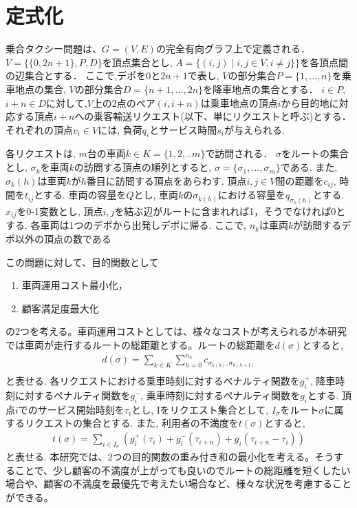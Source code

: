 \chapter{定式化}\label{formulation}
乗合タクシー問題は、$G = (V, E)$の完全有向グラフ上で定義される．$V =\{\{0,2n+1\},P,D\}$を頂点集合とし, $A = \{(i,j) \mid i,j\in V ,i \neq j\}\}$を各頂点間の辺集合とする．
ここで,デポを$0$と$2n+1$で表し, $V$の部分集合$P =\{1,...,n \}$を乗車地点の集合, $V$の部分集合$D =\{n+1,...,2n \}$を降車地点の集合とする．
$i \in P$, $i+n \in D$に対して,$V$上の2点のペア$(i,i+n)$は乗車地点の頂点$i$から目的地に対応する頂点$i+n$への乗客輸送リクエスト(以下、単にリクエストと呼ぶ)とする．
それぞれの頂点$v_i \in V$には, 負荷$q_i$とサービス時間$s_i$が与えられる.

各リクエストは, $m$台の車両$k \in K = \{1,2,..m\}$で訪問される．
$\sigma$をルートの集合とし, $\sigma_k$を車両$k$の訪問する頂点の順列とすると, $\sigma = \{\sigma_1,...,\sigma_m\}$である. また, $\sigma_k(h)$は車両$k$が$h$番目に訪問する頂点をあらわす.
頂点$i,j \in V$間の距離を$c_{ij}$, 時間を$t_{ij}$とする.
車両の容量を$Q$とし, 車両$k$の$\sigma _{k(h)}$における容量を$q_{\sigma_k(h)}$とする.
$x_{ij}$を0-1変数とし, 頂点$i,j$を結ぶ辺がルートに含まれれば1，そうでなければ0とする.
各車両は1つのデポから出発しデポに帰る. ここで, $n_k$は車両$k$が訪問するデポ以外の頂点の数である

この問題に対して、目的関数として
\begin{enumerate}
 \item 車両運用コスト最小化，
 \item 顧客満足度最大化
\end{enumerate}
の2つを考える。車両運用コストとしては、様々なコストが考えられるが本研究では車両が走行するルートの総距離とする。ルートの総距離を$d(\sigma)$とすると,
\begin{align*}
d(\sigma) = \sum_ {k\in K} \sum_{h=0}^{n_k} c_ {\sigma_{k(h)},\sigma_ {k(h+1)} }\\
\end{align*}
と表せる.
各リクエストにおける乗車時刻に対するペナルティ関数を$g^+_i$, 降車時刻に対するペナルティ関数を$g^-_i$, 乗車時刻に対するペナルティ関数を$g_i$とする.
頂点$i$でのサービス開始時刻を$\tau_i$とし, Iをリクエスト集合として, $I_\sigma$をルート$\sigma$に属するリクエストの集合とする.
また, 利用者の不満度を$t(\sigma)$とすると,
\begin{align*}
t(\sigma) = \sum_ {i \in I_\sigma} (g^+_i(\tau_i)+g^-_i(\tau_{i+n})+g_i(\tau_{i+n}-\tau_i))
\end{align*}
と表せる.
本研究では、2つの目的関数の重み付き和の最小化を考える。そうすることで、少し顧客の不満度が上がっても良いのでルートの総距離を短くしたい場合や、顧客の不満度を最優先で考えたい場合など、様々な状況を考慮することができる。

